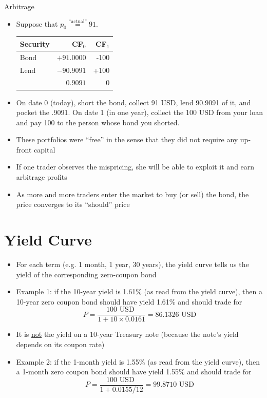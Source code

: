 \documentclass{beamer}
\begin{document}
\begin{frame}{Arbitrage}
	\begin{itemize}
		\item Suppose that $p_{0}\overset{\text{``actual''}}{=}91$. 
		\begin{center}
		\begin{tabular}{l|rr}
			\textbf{Security} & \textbf{CF}$_{0}$ & \textbf{CF}$_{1}$ \\ \hline
			Bond & $+91.0000$ & -100\\
			Lend & $-90.9091$ & +100\\ \hline
				& $0.9091$ & 0
		\end{tabular}
		\end{center}
		\item On date 0 (today), short the bond, collect 91 USD, lend 90.9091 of it, and pocket the .9091. On date 1 (in one year), collect the 100 USD from your loan and pay 100 to the person whose bond you shorted.
	\end{itemize}
\end{frame}

\begin{frame}
	\begin{itemize}
		\item These portfolios were ``free'' in the sense that they did not require any up-front capital
		\item If one trader observes the mispricing, she will be able to exploit it and earn arbitrage profits
		\item As more and more traders enter the market to buy (or sell) the bond, the price converges to its ``should'' price
	\end{itemize}
\end{frame}

\section{Yield Curve}
\begin{frame}
	\begin{itemize}
		\item For each term (e.g. 1 month, 1 year, 30 years), the yield curve tells us the yield of the corresponding zero-coupon bond
		\item Example 1: if the 10-year yield is 1.61\% (as read from the yield curve), then a 10-year zero coupon bond should have yield 1.61\% and should trade for
			\begin{equation}
				P=\frac{100\text{ USD }}{1+10\times0.0161}=86.1326\text{ USD}
			\end{equation}
		\item It is \underline{not} the yield on a 10-year Treasury note (because the note's yield depends on its coupon rate)
		\item Example 2: if the 1-month yield is 1.55\% (as read from the yield curve), then a 1-month zero coupon bond should have yield 1.55\% and should trade for
			\begin{equation}
				P=\frac{100\text{ USD }}{1+0.0155/12}=99.8710\text{ USD}
			\end{equation}
	\end{itemize}
\end{frame}
\end{document}
